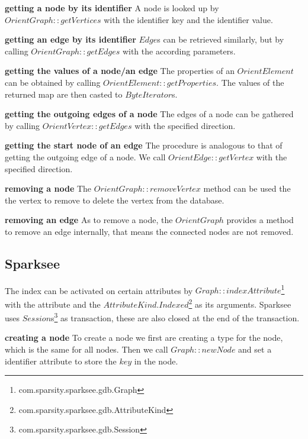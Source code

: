 \textbf{getting a node by its identifier} \newline
A node is looked up by $ OrientGraph::getVertices $ with the identifier key and the identifier value.

\textbf{getting an edge by its identifier} \newline
$ Edge $s can be retrieved similarly,
but by calling $ OrientGraph::getEdges $ with the according parameters.

\textbf{getting the values of a node/an edge} \newline
The properties of an $ OrientElement $ can be obtained by calling $ OrientElement::getProperties $.
The values of the returned map are then casted to $ ByteIterator $s.

\textbf{getting the outgoing edges of a node} \newline
The edges of a node can be gathered by calling $ OrientVertex::getEdges $ with the specified direction.

\textbf{getting the start node of an edge} \newline
The procedure is analogous to that of getting the outgoing edge of a node.
We call $ OrientEdge::getVertex $ with the specified direction.

\textbf{removing a node} \newline
The $ OrientGraph::removeVertex $ method can be used the the vertex to remove to delete the vertex from the database.

\textbf{removing an edge} \newline
As to remove a node,
the $ OrientGraph $ provides a method to remove an edge internally,
that means the connected nodes are not removed.

\subsection{Sparksee}
The index can be activated on certain attributes by $ Graph::indexAttribute $\footnote{com.sparsity.sparksee.gdb.Graph} with the attribute and the $ AttributeKind.Indexed $\footnote{com.sparsity.sparksee.gdb.AttributeKind} as its arguments.
Sparksee uses $ Session $s\footnote{com.sparsity.sparksee.gdb.Session} as transaction,
these are also closed at the end of the transaction.

\textbf{creating a node} \newline
To create a node we first are creating a type for the node,
which is the same for all nodes.
Then we call $ Graph::newNode $ and set a identifier attribute to store the $ key $ in the node.

